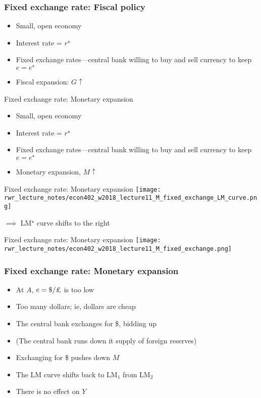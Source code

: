 \documentclass[presentation,dvipsnames]{beamer}
\renewcommand{\pounds}{\text{\textsterling}{ }}
\begin{document}
\begin{frame}
\frametitle{Fixed exchange rate: Fiscal policy}
\begin{itemize}[label={--}]
\item Small, open economy
\item Interest rate = $r^{\star}$
\item Fixed exchange rates---central bank willing to buy and sell currency to keep $e = e^{\star}$
\item Fiscal expansion: $G \uparrow$
\end{itemize}
\end{frame}

\begin{frame}[label=sec-6-2]{Fixed exchange rate: Monetary expansion}
\begin{itemize}[label={--}]
\item Small, open economy
\item Interest rate = $r^{\star}$
\item Fixed exchange rates---central bank willing to buy and sell currency to keep $e = e^{\star}$
\item Monetary expansion, $M \uparrow$
\end{itemize}
\end{frame}
\begin{frame}[label=sec-6-2]{Fixed exchange rate: Monetary expansion}
\texttt{[image: rwr\_lecture\_notes/econ402\_w2018\_lecture11\_M\_fixed\_exchange\_LM\_curve.png]}

$\implies$ LM$^{\star}$ curve shifts to the right

\end{frame}
\begin{frame}[label=sec-6-2]{Fixed exchange rate: Monetary expansion}
\texttt{[image: rwr\_lecture\_notes/econ402\_w2018\_lecture11\_M\_fixed\_exchange.png]}
\end{frame}
\begin{frame}
\frametitle{Fixed exchange rate: Monetary expansion}
\begin{itemize}[label={--}]
\item At $A$, $e = \$ / \pounds$ is too low
\item Too many dollars; ie, dollars are cheap
\item The central bank exchanges \pounds for \$, bidding up \pounds
\item (The central bank runs down it supply of foreign reserves)
\item Exchanging \pounds for \$ pushes down $M$
\item The LM curve shifts back to LM$_{1}$ from LM$_{2}$
\item \textcolor{RubineRed}{There is no effect on $Y$}
\end{itemize}
\end{frame}
\end{document}
